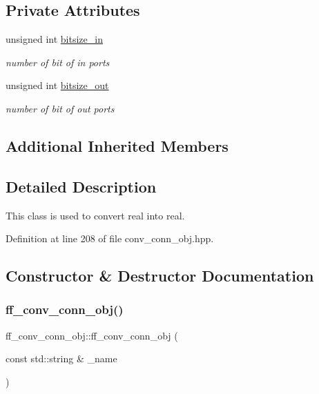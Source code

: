 \subsection*{Private Attributes}
\begin{DoxyCompactItemize}
\item 
unsigned int \hyperlink{classff__conv__conn__obj_a9780825ecb93883761060fd22883d032}{bitsize\+\_\+in}
\begin{DoxyCompactList}\small\item\em number of bit of in ports \end{DoxyCompactList}\item 
unsigned int \hyperlink{classff__conv__conn__obj_adcaa8fdca2353d018666d957de41768d}{bitsize\+\_\+out}
\begin{DoxyCompactList}\small\item\em number of bit of out ports \end{DoxyCompactList}\end{DoxyCompactItemize}
\subsection*{Additional Inherited Members}


\subsection{Detailed Description}
This class is used to convert real into real. 

Definition at line 208 of file conv\+\_\+conn\+\_\+obj.\+hpp.



\subsection{Constructor \& Destructor Documentation}
\mbox{\label{classff__conv__conn__obj_aa0d7869e8c93b47c55d8a351cc9336cf}} 
\subsubsection{\texorpdfstring{ff\+\_\+conv\+\_\+conn\+\_\+obj()}{ff\_conv\_conn\_obj()}}
{\footnotesize\ttfamily ff\+\_\+conv\+\_\+conn\+\_\+obj\+::ff\+\_\+conv\+\_\+conn\+\_\+obj (\begin{DoxyParamCaption}\item[{const std\+::string \&}]{\+\_\+name }\end{DoxyParamCaption})\hspace{0.3cm}{\ttfamily [inline]}}




